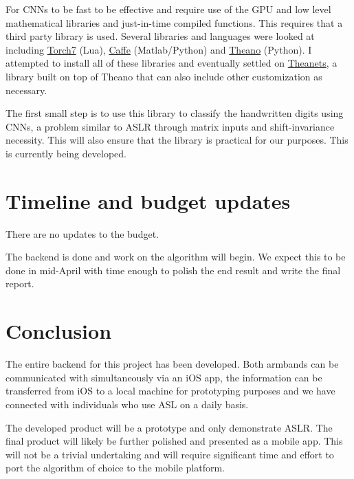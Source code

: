 For CNNs to be fast to be effective and require use of the GPU and low level mathematical libraries and just-in-time compiled functions. This requires that a third party library is used. Several libraries and languages were looked at including \href{https://en.wikipedia.org/wiki/Torch_(machine_learning)}{Torch7} (Lua), \href{http://caffe.berkeleyvision.org}{Caffe} (Matlab/Python) and \href{http://www.deeplearning.net/software/theano/}{Theano} (Python). I attempted to install all of these libraries and eventually settled on \href{http://theanets.readthedocs.org/en/latest/}{Theanets}, a library built on top of Theano that can also include other customization as necessary.

The first small step is to use this library to classify the handwritten digits using CNNs, a problem similar to ASLR through matrix inputs and shift-invariance necessity. This will also ensure that the library is practical for our purposes. This is currently being developed.

\section{Timeline and budget updates}
There are no updates to the budget.

The backend is done and work on the algorithm will begin. We expect this to be done in mid-April with time enough to polish the end result and write the final report.

\section{Conclusion}
The entire backend for this project has been developed. Both armbands can be communicated with simultaneously via an iOS app, the information can be transferred from iOS to a local machine for prototyping purposes and we have connected with individuals who use ASL on a daily basis.

The developed product will be a prototype and only demonstrate ASLR. The final product will likely be further polished and presented as a mobile app. This will not be a trivial undertaking and will require significant time and effort to port the algorithm of choice to the mobile platform.





